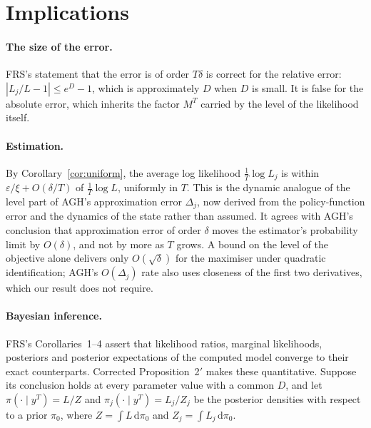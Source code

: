 \documentclass[11pt]{article}
\theoremstyle{definition}
\theoremstyle{remark}
\newcommand{\dd}{\mathrm{d}}
\begin{document}
\section{Implications}\label{sec:implications}

\paragraph{The size of the error.} FRS's statement that the error is of order $T\delta$ is
correct for the relative error: $|L_j/L - 1| \le e^{D} - 1$, which is approximately $D$ when $D$
is small. It is false for the absolute error, which inherits the factor $M^T$ carried by the level
of the likelihood itself.

\paragraph{Estimation.} By Corollary~\ref{cor:uniform}, the average log likelihood
$\frac1T\log L_j$ is within $\varepsilon/\xi + O(\delta/T)$ of $\frac1T\log L$, uniformly in $T$.
This is the dynamic analogue of the level part of AGH's approximation error $\Delta_j$, now
derived from the policy-function error and the dynamics of the state rather than assumed. It
agrees with AGH's conclusion that approximation error of order $\delta$ moves the estimator's
probability limit by $O(\delta)$, and not by more as $T$ grows. A bound on the level of the
objective alone delivers only $O(\sqrt\delta)$ for the maximiser under quadratic identification;
AGH's $O(\Delta_j)$ rate also uses closeness of the first two derivatives, which our result does
not require.

\paragraph{Bayesian inference.} FRS's Corollaries~1--4 assert that likelihood ratios, marginal
likelihoods, posteriors and posterior expectations of the computed model converge to their exact
counterparts. Corrected Proposition~2$'$ makes these quantitative. Suppose its conclusion holds
at every parameter value with a common $D$, and let $\pi(\cdot\mid y^T) = L/Z$ and
$\pi_j(\cdot\mid y^T) = L_j/Z_j$ be the posterior densities with respect to a prior $\pi_0$, where
$Z = \int L\,\dd\pi_0$ and $Z_j = \int L_j\,\dd\pi_0$.
\end{document}
